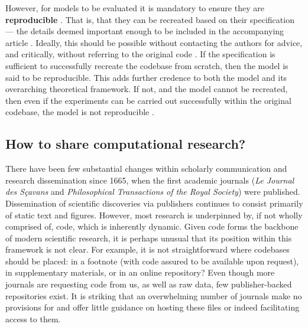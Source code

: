 \documentclass[jou]{apa6}
\begin{document}
However, for models to be evaluated
it is mandatory to ensure they are \textbf{reproducible} \cite{topalidou15}.  
That is, that they can be recreated based on their specification --- the details deemed important enough to be included in the accompanying article \cite{hinsen15}.
Ideally, this should be possible without contacting the authors for advice, and critically, without referring to the original code \cite{cooper14}.
If the specification is sufficient to successfully recreate the codebase from scratch, then the model is said to be reproducible.
This adds further credence to both the model and its overarching theoretical framework.
If not, and the model cannot be recreated, then even if the experiments can be carried out successfully within the original codebase, the model is not reproducible \cite{crook13}.

\subsection*{How to share computational research?}
There have been few substantial changes within scholarly communication and research dissemination since 1665, when the first academic journals (\textit{Le Journal des Sçavans} and \textit{Philosophical Transactions of the Royal Society}) were published.
Dissemination of scientific discoveries via publishers continues to consist primarily of static text and figures.
However, most research is underpinned by, if not wholly comprised of, code, which is inherently dynamic.
Given code forms the backbone of modern scientific research, it is perhaps unusual that its position within this framework is not clear.
For example, it is not straightforward where codebases should be placed: in a footnote (with code assured to be available upon request), in supplementary materials, or in an online repository?
Even though more journals are requesting code from us, as well as raw data, few publisher-backed repositories exist.
It is striking that an overwhelming number of journals make no provisions for and offer little guidance on hosting these files or indeed facilitating access to them.
\end{document}
